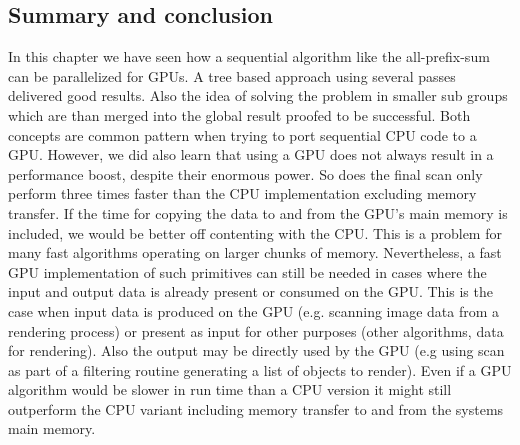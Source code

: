 \subsection{Summary and conclusion}
In this chapter we have seen how a sequential algorithm like the all-prefix-sum can be parallelized for GPUs. A tree based approach using several passes delivered good results. Also the idea of solving the problem in smaller sub groups which are than merged into the global result proofed to be successful. Both concepts are common pattern when trying to port sequential CPU code to a GPU. However, we did also learn that using a GPU does not always result in a performance boost, despite their enormous power. So does the final scan only perform three times faster than the CPU implementation excluding memory transfer. If the time for copying the data to and from the GPU's main memory is included, we would be better off contenting with the CPU. This is a problem for many fast algorithms operating on larger chunks of memory. Nevertheless, a fast GPU implementation of such primitives can still be needed in cases where the input and output data is already present or consumed on the GPU. This is the case when input data is produced on the GPU (e.g. scanning image data from a rendering process) or present as input for other purposes (other algorithms, data for rendering). Also the output may be directly used by the GPU (e.g using scan as part of a filtering routine generating a list of objects to render). Even if a GPU algorithm would be slower in run time than a CPU version it might still outperform the CPU variant including memory transfer to and from the systems main memory.
